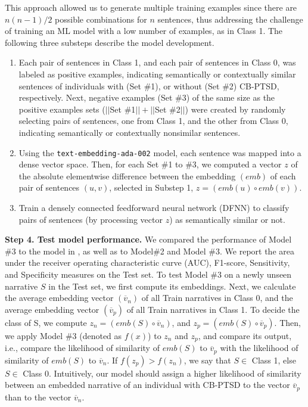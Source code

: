 \documentclass[bst/sn-nature]{sn-jnl}%
\theoremstyle{thmstyleone}%
\theoremstyle{thmstyletwo}%
\theoremstyle{thmstylethree}%
\begin{document}
\begin{appendices}
This approach allowed us to generate multiple training examples since there are $n(n-1)/2$ possible combinations for $n$ sentences, thus addressing the challenge of training an ML model with a low number of examples, as in Class 1.
The following three substeps describe the model development.
\begin{enumerate}
    \item 
    Each pair of sentences in Class 1, and each pair of sentences in Class 0, was labeled as positive examples, indicating semantically or contextually similar sentences of individuals with (Set \#1), or without (Set \#2) CB-PTSD, respectively. 
    Next, negative examples (Set \#3) of the same size as the positive examples sets ($||$Set \#1$|| + ||$Set \#2$||$) were created by randomly selecting pairs of sentences, one from Class 1, and the other from Class 0, indicating semantically or contextually nonsimilar sentences.
    \item 
    Using the \texttt{text-embedding-ada-002} model, each sentence was mapped into a dense vector space. 
    Then, for each Set \#1 to \#3, we computed a vector $z$ of the absolute elementwise difference between the embedding $(emb)$ of each pair of sentences $(u,v)$, selected in Substep 1, $z=(emb(u)\circ emb(v))$.
    \item 
    Train a densely connected feedforward neural network (DFNN) to classify pairs of sentences (by processing vector $z$) as semantically similar or not.
\end{enumerate}

\textbf{Step 4. Test model performance.}
We compared the performance of Model \#3 to the model in \cite{bartal2023identifying}, as well as to Model\#2 and Model \#3.
We report the area under the receiver operating characteristic curve (AUC), F1-score, Sensitivity, and Specificity measures on the Test set. 
To test Model \#3 on a newly unseen narrative $S$ in the Test set, we first compute its embeddings.
Next, we calculate the average embedding vector $(\overline{v}_n)$ of all Train narratives in Class 0, and the average embedding vector $(\overline{v} _p)$ of all Train narratives in Class 1.
To decide the class of S, we compute $z_n=(emb(S)\circ \overline{v}_n)$, and $z_p=(emb(S)\circ \overline{v}_p)$. 
Then, we apply Model \#3 (denoted as $f(x)$) to $z_n$ and $z_p$, and compare its output, i.e., compare the likelihood of similarity of $emb(S)$ to $\overline{v}_p$ with the likelihood of similarity of $emb(S)$ to $\overline{v}_n$.
If $f(z_p)> f(z_n)$, we say that $S \in$ Class 1, else $S\in$ Class 0. 
Intuitively, our model should assign a higher likelihood of similarity between an embedded narrative of an individual with CB-PTSD to the vector $\overline{v}_p$ than to the vector $\overline{v}_n$.



\end{appendices}
\end{document}
